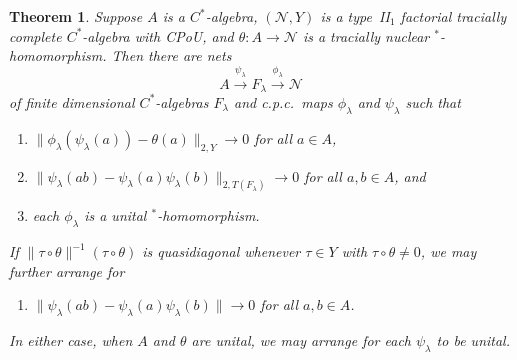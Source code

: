 \documentclass[a4paper,11pt]{amsart}
\newtheorem{theorem}{Theorem}
\theoremstyle{definition}
\numberwithin{equation}{section}
\numberwithin{theorem}{section}
\begin{document}
\begin{theorem}\label{thm:decomposable}
	Suppose $A$ is a $C^*$-algebra, $(\mathcal N, Y)$ is a type~{\rm II}$_1$ factorial tracially complete $C^*$-algebra with CPoU, and $\theta \colon A \rightarrow \mathcal N$ is a tracially nuclear $^*$-homomorphism.  Then there are nets
	\begin{equation}
		A \overset{\psi_\lambda}{\longrightarrow} F_\lambda \overset{\phi_\lambda}{\longrightarrow} \mathcal N
	\end{equation}
	of finite dimensional $C^*$-algebras $F_\lambda$ and c.p.c.\ maps $\phi_\lambda$ and $\psi_\lambda$ such that
	\begin{enumerate}
		\item $\| \phi_\lambda(\psi_\lambda(a)) - \theta(a)\|_{2, Y} \rightarrow 0$ for all $a \in A$,
		\item $\| \psi_\lambda(ab) - \psi_\lambda(a) \psi_\lambda(b)\|_{2, T(F_\lambda)} \rightarrow 0$ for all $a, b \in A$, and
		\item each $\phi_\lambda$ is a unital $^*$-homomorphism.
	\end{enumerate}
	If $\|\tau \circ \theta\|^{-1} (\tau \circ \theta)$ is quasidiagonal whenever $\tau \in Y$ with $\tau \circ \theta \neq 0$, we may further arrange for 
	\begin{enumerate}
		\item[\rm (ii$'$)] $\| \psi_\lambda(ab) - \psi_\lambda(a)\psi_\lambda(b)\| \rightarrow 0$ for all $a, b \in A$. 
	\end{enumerate}
	In either case, when $A$ and $\theta$ are unital, we may arrange for each $\psi_\lambda$ to be unital.
\end{theorem}
\end{document}
